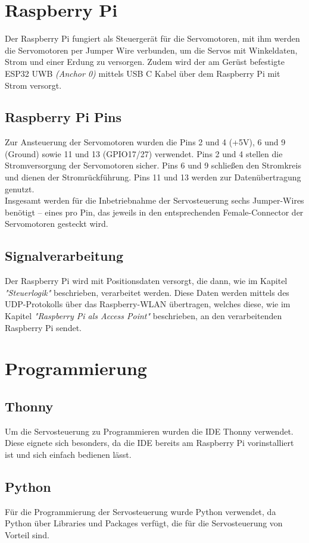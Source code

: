 \section{Raspberry Pi}
Der Raspberry Pi fungiert als Steuergerät für die Servomotoren, mit ihm werden die Servomotoren per Jumper Wire verbunden, um die Servos mit Winkeldaten, Strom und einer Erdung zu versorgen. Zudem wird der am Gerüst befestigte ESP32 UWB \textit{(Anchor 0)} mittels USB C Kabel über dem Raspberry Pi mit Strom versorgt. 

\subsection{Raspberry Pi Pins}
Zur Ansteuerung der Servomotoren wurden die Pins 2 und 4 (+5V), 6 und 9 (Ground) sowie 11 und 13 (GPIO17/27) verwendet. Pins 2 und 4 stellen die Stromversorgung der Servomotoren sicher. Pins 6 und 9 schließen den Stromkreis und dienen der Stromrückführung. Pins 11 und 13 werden zur Datenübertragung genutzt.\\
Insgesamt werden für die Inbetriebnahme der Servosteuerung sechs Jumper-Wires benötigt – eines pro Pin, das jeweils in den entsprechenden Female-Connector der Servomotoren gesteckt wird.


\subsection{Signalverarbeitung}
Der Raspberry Pi wird mit Positionsdaten versorgt, die dann, wie im Kapitel \textit{"Steuerlogik"} beschrieben, verarbeitet werden. Diese Daten werden mittels des UDP-Protokolls über das Raspberry-WLAN übertragen, welches diese, wie im Kapitel \textit{"Raspberry Pi als Access Point"} beschrieben, an den verarbeitenden Raspberry Pi sendet.

\section{Programmierung}
\subsection{Thonny}
Um die Servosteuerung zu Programmieren wurden die IDE Thonny verwendet. Diese eignete sich besonders, da die IDE bereits am Raspberry Pi vorinstalliert ist und sich einfach bedienen lässt.

\subsection{Python}
Für die Programmierung der Servosteuerung wurde Python verwendet, da Python über Libraries und Packages verfügt, die für die Servosteuerung von Vorteil sind. 

